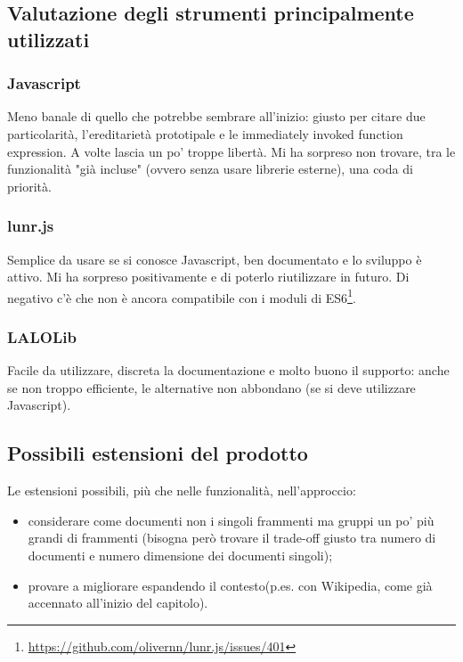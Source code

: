 \subsection{Valutazione degli strumenti principalmente utilizzati}
\subsubsection{Javascript}
Meno banale di quello che potrebbe sembrare all'inizio: giusto per citare due particolarità, l'ereditarietà prototipale e le immediately invoked function expression. A volte lascia un po' troppe libertà. Mi ha sorpreso non trovare, tra le funzionalità "già incluse" (ovvero senza usare librerie esterne), una coda di priorità.

\subsubsection{lunr.js}
Semplice da usare se si conosce Javascript, ben documentato e lo sviluppo è attivo. Mi ha sorpreso positivamente e di poterlo riutilizzare in futuro. Di negativo c'è che non è ancora compatibile con i moduli di ES6\footnote{\url{https://github.com/olivernn/lunr.js/issues/401}}. 

\subsubsection{LALOLib}
Facile da utilizzare, discreta la documentazione e molto buono il supporto: anche se non troppo efficiente, le alternative non abbondano (se si deve utilizzare Javascript).     
\subsection{Possibili estensioni del prodotto}
Le estensioni possibili, più che nelle funzionalità, nell'approccio:
\begin{itemize}
    \item considerare come documenti non i singoli frammenti ma gruppi un po' più grandi di frammenti (bisogna però trovare il trade-off giusto tra numero di documenti e numero dimensione dei documenti singoli);
    \item provare a migliorare espandendo il contesto(p.es. con Wikipedia, come già accennato all'inizio del capitolo).
\end{itemize} 
